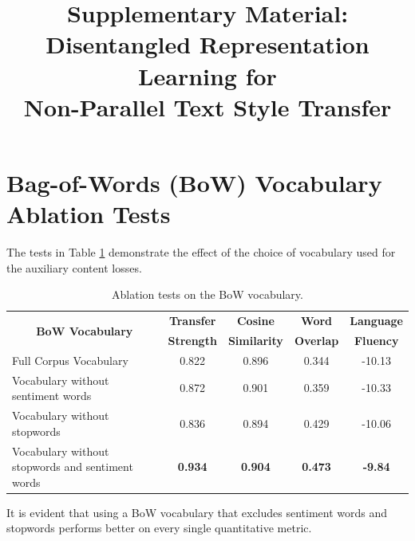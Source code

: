 \documentclass[letterpaper]{article}
\title{Supplementary Material:\\Disentangled Representation Learning for\\Non-Parallel Text Style Transfer}
\date{}
\author{}
\begin{document}
\maketitle
\graphicspath{{images/}}

\newcommand{\tabh}[1]{\multicolumn{1}{c|}{\textbf{#1}}}
\newcommand{\tabc}[2]{\multicolumn{1}{|c||}{\multirow{#1}{*}{\textbf{#2}}}}

\newcommand{\loss}[1]{J_{\text{#1}}}

\section{Bag-of-Words (BoW) Vocabulary Ablation Tests}

The tests in Table \ref{tab:bow-vocab-ablation} demonstrate the effect of the choice of vocabulary used for the auxiliary content losses.

\begin{table}[ht]
	\centering
	\begin{tabular}{| l || c | c | c | c |}
		\hline
		\tabc{2}{BoW Vocabulary}                         & \tabh{Transfer} & \tabh{Cosine}     & \tabh{Word}    & \tabh{Language} \\
		                                                 & \tabh{Strength} & \tabh{Similarity} & \tabh{Overlap} & \tabh{Fluency}  \\
		\hline
		\hline
		Full Corpus Vocabulary                           & 0.822           & 0.896             & 0.344          & -10.13          \\
		\hline
		Vocabulary without sentiment words               & 0.872           & 0.901             & 0.359          & -10.33          \\
		\hline
		Vocabulary without stopwords                     & 0.836           & 0.894             & 0.429          & -10.06          \\
		\hline
		Vocabulary without stopwords and sentiment words & \textbf{0.934}  & \textbf{0.904}    & \textbf{0.473} & \textbf{-9.84}  \\
		\hline
	\end{tabular}
	\caption{Ablation tests on the BoW vocabulary.}
	\label{tab:bow-vocab-ablation}
\end{table}

It is evident that using a BoW vocabulary that excludes sentiment words and stopwords performs better on every single quantitative metric.
\end{document}

